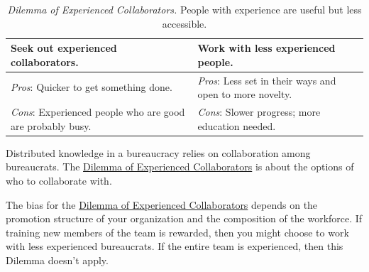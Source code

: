 \begin{center}
\begin{table}[H] %
\begin{tabular}{ | m{\dilemmatablewidth}| m{\dilemmatablewidth} | } 
  \hline
  \textbf{Seek out experienced collaborators.} & 
  \textbf{Work with less experienced people.} \\ 
  \hline
  \textit{Pros}: Quicker to get something done. &
  \textit{Pros}: Less set in their ways and open to more novelty. \\  
  \hline
  \textit{Cons}: Experienced people who are good are probably busy. &
  \textit{Cons}: Slower progress; more education needed. \\  
  \hline
\end{tabular}
\caption{
\textit{Dilemma of Experienced Collaborators.}
People with experience are useful but less accessible.
}
\label{table:dilemma-personal-experienced-collaborators}
\end{table}
\end{center}


Distributed knowledge in a bureaucracy relies on collaboration among bureaucrats. 
The \hyperref[table:dilemma-personal-experienced-collaborators]{Dilemma of Experienced Collaborators} is 
\iftoggle{printedonpaper}{ (\ref{table:dilemma-personal-experienced-collaborators})}{}about the options of who to collaborate with. 


The bias for the \hyperref[table:dilemma-personal-experienced-collaborators]{Dilemma of Experienced Collaborators} depends on the promotion structure of your organization and the composition of the workforce. If training new members of the team is rewarded, then you might choose to work with less experienced bureaucrats. If the entire team is experienced, then this Dilemma doesn't apply.

